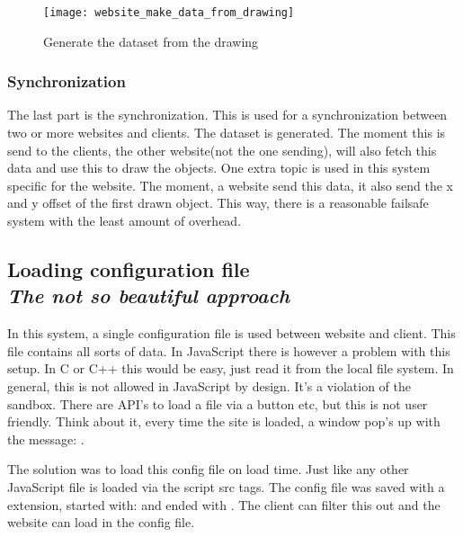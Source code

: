 \begin{figure}[H]
    \centering
    \texttt{[image: website\_make\_data\_from\_drawing]}
    \caption{Generate the dataset from the drawing}
    \label{fig:website_make_data_from_drawing}
\end{figure}

\subsubsection{Synchronization}
The last part is the synchronization. This is used for a synchronization between two or more websites and clients.
The dataset is generated.
The moment this is send to the clients, the other website(not the one sending), will also fetch this data and use this to draw the objects.
One extra topic is used in this system specific for the website.
The moment, a website send this data, it also send the x and y offset of the first drawn object.
This way, there is a reasonable failsafe system with the least amount of overhead\footnotemark.

\subsection{Loading configuration file\\
    \small\nimbus\textit{The not so beautiful approach}}
In this system, a single configuration file is used between website and client.
This file contains all sorts of data.
In JavaScript there is however a problem with this setup. In C or C++ this would be easy, just read it from the local file system.
In general, this is not allowed in JavaScript by design. It's a violation of the sandbox.
There are API's to load a file via a button etc, but this is not user friendly.
Think about it, every time the site is loaded, a window pop's up with the message:
.

The solution was to load this config file on load time. Just like any other JavaScript file is loaded via the script src tags.
The config file was saved with a  extension, started with:  and ended with \say{;}.
The client can filter this out and the website can load in the config file.

